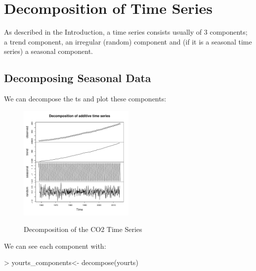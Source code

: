 \documentclass[10pt, a4paper]{article} %
\begin{document}
  \pagebreak

\section{Decomposition of Time Series}%
As described in the Introduction, a time series consists usually of 3 components; a trend component, an irregular (random) component and (if it is a seasonal time series) a seasonal component. 

 
\subsection{Decomposing Seasonal Data}%
\noindent We can decompose the ts and plot these components:


\begin{figure}[H]
\caption{Decomposition of the CO2 Time Series}
 \begin{center}
\includegraphics[width=0.5\textwidth]{FINAL_VERSION-decompose.pdf}
\label{decompose}
\end{center}
\end{figure}

\noindent We can see each component with:
\begin{Schunk}
\begin{Sinput}
> yourts_components<- decompose(yourts)
\end{Sinput}
\end{Schunk}
\begin{Schunk}
\end{Schunk}
\end{document}
